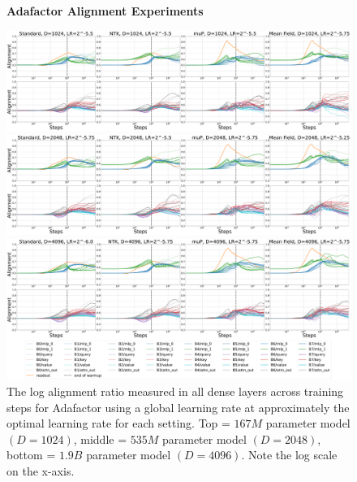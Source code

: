 \begin{figure}[ht]
    \begin{center}
        \textbf{Adafactor Alignment Experiments}\\
        \figvspace
        
        \includegraphics[width=\linewidth, trim={0, 0, 0, 0},clip]{icml2024/figures/alignment/appendix/adafactor_ps_on_1024.pdf}
       
        \figvspace
        \figvspace
       
        \includegraphics[width=\linewidth, trim={0, 0, 0, 0},clip]{icml2024/figures/alignment/appendix/adafactor_ps_on_2048.pdf}
       
        \figvspace
        \figvspace
       
        \includegraphics[width=\linewidth, trim={0, 0, 0, 0},clip]{icml2024/figures/alignment/appendix/adafactor_ps_on_4096_legend.pdf}
        \caption{The log alignment ratio measured in all dense layers across training steps for Adafactor using a global learning rate at approximately the optimal learning rate for each setting. Top = $167M$ parameter model $(D=1024)$, middle = $535M$ parameter model $(D=2048)$, bottom = $1.9B$ parameter model $(D=4096)$. Note the log scale on the x-axis.}
        \label{fig:appendix_alignment_adafactor}
    \end{center}
\end{figure}
\clearpage

